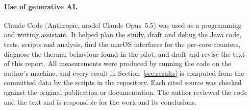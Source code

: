 \documentclass[11pt,a4paper]{article}
\begin{document}
\paragraph{Use of generative AI.} Claude Code (Anthropic, model Claude Opus~5.5)
was used as a programming and writing assistant. It helped plan the study, draft
and debug the Java code, tests, scripts and analysis, find the macOS interfaces
for the per-core counters, diagnose the thermal behaviour found in the pilot,
and draft and revise the text of this report. All measurements were produced by
running the code on the author's machine, and every result in
Section~\ref{sec:results} is computed from the committed data by the scripts in
the repository. Each cited source was checked against the original publication
or documentation. The author reviewed the code and the text and is responsible
for the work and its conclusions.
\end{document}
